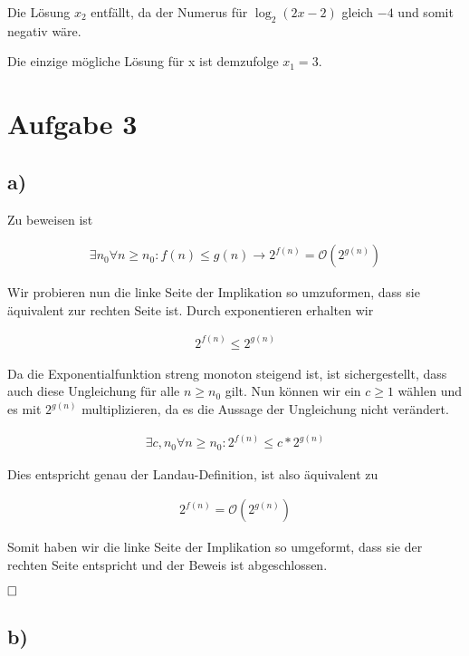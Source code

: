\documentclass[12pt]{scrartcl}%
\theoremstyle{nonumberplain}
\newcommand{\bO}[1]{\mathcal O(#1)}
\begin{document}
Die Lösung $x_2$ entfällt, da der Numerus für $\log_{2}{(2x-2)}$ gleich $-4$ und somit negativ wäre.

Die einzige mögliche Lösung für x ist demzufolge $x_1 = 3$.

\newpage

\section*{Aufgabe 3}
\subsection*{a)}

Zu beweisen ist

\begin{align}
	\exists n_0 \forall n \ge n_0: f(n) \le g(n) \rightarrow 2^{f(n)} = \bO{2^{g(n)}} 
\end{align}

Wir probieren nun die linke Seite der Implikation so umzuformen, dass sie äquivalent zur rechten Seite ist. Durch exponentieren erhalten wir

\begin{align}
	2^{f(n)} \le 2^{g(n)}
\end{align}

Da die Exponentialfunktion streng monoton steigend ist, ist sichergestellt, dass auch diese Ungleichung für alle $n \ge n_0$ gilt. Nun können wir ein $c \ge 1$ wählen und es mit $2^{g(n)}$ multiplizieren, da es die Aussage der Ungleichung nicht verändert.

\begin{align}
	\exists c,n_0 \forall n \ge n_0: 2^{f(n)} \le c * 2^{g(n)}
\end{align}

Dies entspricht genau der Landau-Definition, ist also äquivalent zu

\begin{align}
	2^{f(n)} = \bO{2^{g(n)}}
\end{align}

Somit haben wir die linke Seite der Implikation so umgeformt, dass sie der rechten Seite entspricht und der Beweis ist abgeschlossen.

$\hfill \square$

\newpage
\setcounter{equation}{0}

\subsection*{b)}
\end{document}
